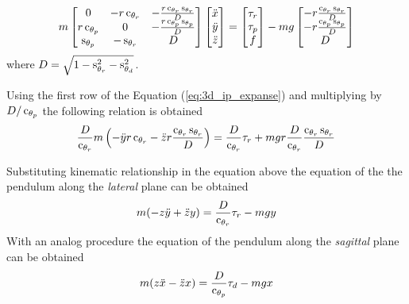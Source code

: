 \begin{equation}
  \label{eq:3d_ip_expanse}
  m
  \begin{bmatrix}
    0 & -r \cosine{\theta_r} & -\frac{r \cosine{\theta_r} \sine{\theta_r}}{D}\\
    r\cosine{\theta_p} & 0 &-\frac{r \cosine{\theta_p} \sine{\theta_p}}{D}\\
    \sine{\theta_p} & -\sine{\theta_r} & D
  \end{bmatrix}
  \begin{bmatrix}
    \ddot{x}\\
    \ddot{y}\\
    \ddot{z}
  \end{bmatrix} =
  \begin{bmatrix}
    \tau_r\\
    \tau_p\\
    f
  \end{bmatrix}
  - mg
  \begin{bmatrix}
    - r \frac{\cosine{\theta_r} \sine{\theta_r}}{D}\\
    - r \frac{\cosine{\theta_p} \sine{\theta_p}}{D}\\
    D
  \end{bmatrix}
\end{equation}
where $D = \sqrt{1 - \mathop{}\!\mathrm{s}_{\theta_r} ^ 2 - \mathop{}\!\mathrm{s}_{\theta_d} ^ 2}$.
\par
Using the first row of the Equation (\ref{eq:3d_ip_expanse}) and multiplying by $D / \mathop{}\!\mathrm{c}_{\theta_p}$ the following relation is obtained
\[
\frac{D}{\cosine{\theta_r}} m \left(-\ddot{y} r \cosine{\theta_r} - \ddot{z} r\frac{\cosine{\theta_r}\sine{\theta_r}}{D} \right ) =  \frac{D}{\cosine{\theta_r}} \tau_r + m g r \frac{D}{\cosine{\theta_r}}  \frac{\cosine{\theta_r} \sine{\theta_r}}{D} 
\]
\par
Substituting kinematic relationship in the equation above the equation of the the pendulum along
the \emph{lateral} plane can be obtained
\begin{equation}
  \label{eq:3d_ip_y}
  m(-z \ddot{y} + \ddot{z} y) = \frac{D}{\mathop{}\!\mathrm{c}_{\theta_r}} \tau_r - m g y 
\end{equation}
With an analog procedure the equation of the pendulum along the \emph{sagittal} plane can be obtained
\begin{equation}
  \label{eq:3d_ip_x}
  m(z \ddot{x} - \ddot{z} x) = \frac{D}{\mathop{}\!\mathrm{c}_{\theta_p}} \tau_d - m g x 
\end{equation}

